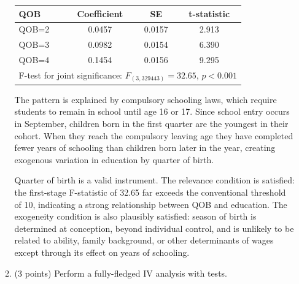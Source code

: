 \documentclass[a4paper]{article}
\begin{document}
\begin{enumerate}
\begin{enumerate}
{                        \begin{center}
                            \begin{tabular}{lccc}
                                \toprule
                                QOB & Coefficient & SE & t-statistic \\
                                \midrule
                                QOB=2 & 0.0457 & 0.0157 & 2.913 \\
                                QOB=3 & 0.0982 & 0.0154 & 6.390 \\
                                QOB=4 & 0.1454 & 0.0156 & 9.295 \\
                                \midrule
                                \multicolumn{4}{c}{F-test for joint significance: $F_{(3,329443)} = 32.65$, $p < 0.001$} \\
                                \bottomrule
                            \end{tabular}
                        \end{center}

                        The pattern is explained by compulsory schooling laws, which require
                        students to remain in school until age 16 or 17. Since school entry
                        occurs in September, children born in the first quarter are the youngest
                        in their cohort. When they reach the compulsory leaving age they have
                        completed fewer years of schooling than children born later in the year,
                        creating exogenous variation in education by quarter of birth.

                        Quarter of birth is a valid instrument. The relevance condition is
                        satisfied: the first-stage F-statistic of 32.65 far exceeds the
                        conventional threshold of 10, indicating a strong relationship between
                        QOB and education. The exogeneity condition is also plausibly satisfied:
                        season of birth is determined at conception, beyond individual control,
                        and is unlikely to be related to ability, family background, or other
                        determinants of wages except through its effect on years of schooling.
                    }

              \item (3 points) Perform a fully-fledged IV analysis with tests.


\end{enumerate}
\end{enumerate}
\end{document}
